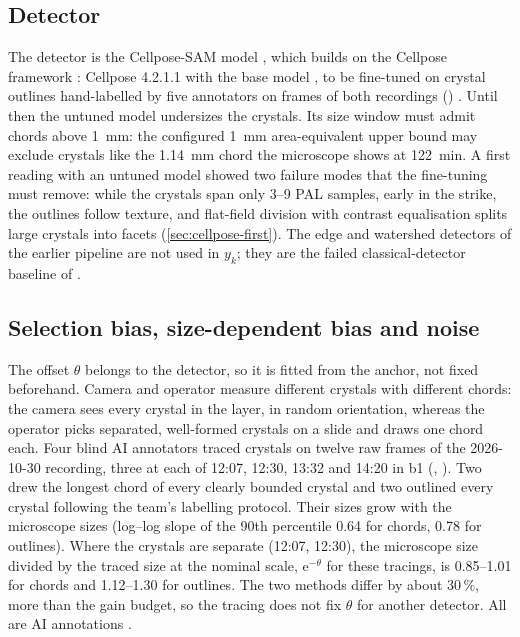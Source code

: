 \subsection{Detector}\label{sec:detector}

The detector is the Cellpose-SAM model \citep{Pachitariu2025}, which builds on the Cellpose framework
\citep{Stringer2021}: Cellpose 4.2.1.1 with the base model , to be fine-tuned \citep{PachitariuStringer2022}
on crystal outlines hand-labelled by five annotators on frames of both recordings ()
. Until then the untuned model undersizes the
crystals. Its size window must admit chords above
1~mm: the configured 1~mm area-equivalent upper bound may exclude crystals like the 1.14~mm chord the microscope
shows at 122~min. A first reading with an untuned model showed two failure modes that the fine-tuning must remove:
while the crystals span only 3--9 PAL samples, early in the strike, the outlines follow texture, and flat-field
division with contrast equalisation splits large crystals into facets (\ref{sec:cellpose-first}). The edge and
watershed detectors of the earlier pipeline are not used in $y_k$; they are the failed classical-detector baseline of
.

\subsection{Selection bias, size-dependent bias and noise}\label{sec:bias}

The offset $\theta$ belongs to the detector, so it is fitted from the anchor, not fixed beforehand. Camera and
operator measure different crystals with different chords: the camera sees every crystal in the layer, in random
orientation, whereas the operator picks separated, well-formed crystals on a slide and draws one chord each. Four
blind AI annotators traced crystals on twelve raw frames of the 2026-10-30 recording, three at each of 12:07, 12:30,
13:32 and 14:20 in b1 (, ). Two drew the
longest chord of every clearly bounded crystal and two outlined every crystal following the team's labelling
protocol. Their sizes grow with the microscope sizes (log--log slope of the 90th percentile 0.64 for chords, 0.78 for
outlines). Where the crystals are separate (12:07, 12:30), the microscope size divided by the traced size at the
nominal scale, $\mathrm{e}^{-\theta}$ for these tracings, is 0.85--1.01 for chords and 1.12--1.30 for outlines. The
two methods differ by about 30\,\%, more than the gain budget, so the tracing does not fix $\theta$ for another
detector. All are AI annotations .

